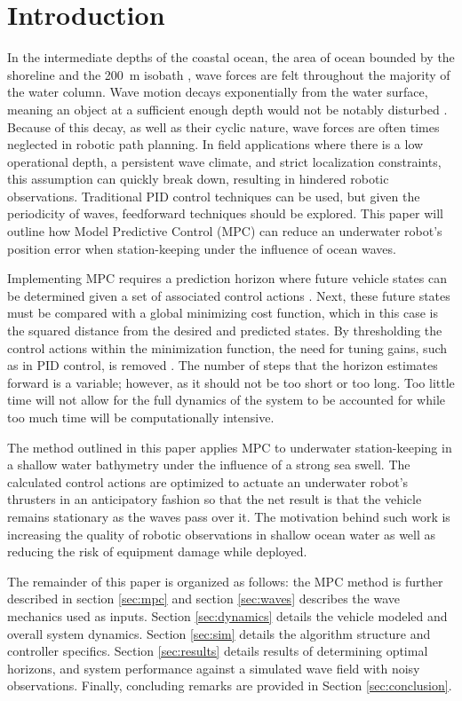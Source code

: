 \documentclass[letterpaper, 10pt, conference]{IEEEtran}
\begin{document}
\section{Introduction} 
\label{sec:introduction}

In the intermediate depths of the coastal ocean, the area of ocean bounded by the shoreline and the 200~m isobath \cite{phillips}, wave forces are felt throughout the majority of the water column. Wave motion decays exponentially from the water surface, meaning an object at a sufficient enough depth would not be notably disturbed \cite{D&D}. Because of this decay, as well as their cyclic nature, wave forces are often times neglected in robotic path planning. In field applications where there is a low operational depth, a persistent wave climate, and strict localization constraints, this assumption can quickly break down, resulting in hindered robotic observations. Traditional PID control techniques can be used, but given the periodicity of waves, feedforward techniques should be explored. This paper will outline how Model Predictive Control (MPC) can reduce an underwater robot's position error when station-keeping under the influence of ocean waves.

Implementing MPC requires a prediction horizon where future vehicle states can be determined given a set of associated control actions \cite{camacho}. Next, these future states must be compared with a global minimizing cost function, which in this case is the squared distance from the desired and predicted states. By thresholding the control actions within the minimization function, the need for tuning gains, such as in PID control, is removed \cite{rawlings}. The number of steps that the horizon estimates forward is a variable; however, as it should not be too short or too long. Too little time will not allow for the full dynamics of the system to be accounted for while too much time will be computationally intensive.

The method outlined in this paper applies MPC to underwater station-keeping in a shallow water bathymetry under the influence of a strong sea swell. The calculated control actions are optimized to actuate an underwater robot's thrusters in an anticipatory fashion so that the net result is that the vehicle remains stationary as the waves pass over it. The motivation behind such work is increasing the quality of robotic observations in shallow ocean water as well as reducing the risk of equipment damage while deployed.

The remainder of this paper is organized as follows: the MPC method is further described in section \ref{sec:mpc} and section \ref{sec:waves} describes the wave mechanics used as inputs. Section \ref{sec:dynamics} details the vehicle modeled and overall system dynamics. Section \ref{sec:sim} details the algorithm structure and controller specifics. Section \ref{sec:results} details results of determining optimal horizons, and system performance against a simulated wave field with noisy observations. Finally, concluding remarks are provided in Section \ref{sec:conclusion}. %
\end{document}
